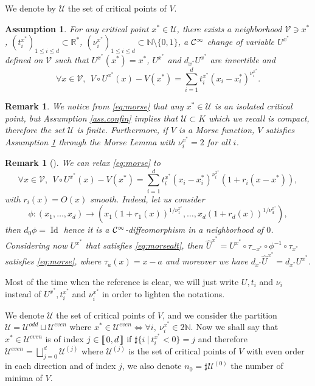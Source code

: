 \documentclass[12pt]{amsart}
\newcommand{\Id}{\operatorname{Id}}
\newcommand{\N}{\mathbb N}
\newcommand{\R}{\mathbb R}
\numberwithin{equation}{section}
\numberwithin{figure}{section}
\newcommand{\lb}{\operatorname{[\negthinspace [}}
\newcommand{\rb}{\operatorname{]\negthinspace ]}}
\newtheorem{remark}[defin]{Remark}
\newtheorem{assumption}{Assumption}
\def\uuu{{\mathcal U}}\def\vvv{{\mathcal V}}\def\www{{\mathcal W}}\def\xxx{{\mathcal X}}
\begin{document}
We denote by $\uuu$ the set of critical points of $V$.
\begin{assumption}\label{ass.morse}
    For any critical point $x^*\in\uuu$, there exists a neighborhood $\vvv\ni x^*$, $(t_i^{x^*})_{1\leq i\leq d}\subset \R^{*}$, $(\nu_i^{x^*})_{1\leq i\leq d}\subset \N\setminus\{0,1\}$, a ${\mathcal C}^\infty$ change of variable $U^{x^*}$ defined on $\vvv$ such that $U^{x^*}(x^*)=x^*$, $U^{x^*}$ and $d_{x^*}U^{x^*}$ are invertible and
    \begin{equation}\label{eq:morse}
    \forall x\in\vvv,\ \ V\circ U^{x^*}(x) - V(x^*) = \sum_{i=1}^dt_i^{x^*}(x_i-x_i^*)^{\nu_i^{x^*}}.
    \end{equation}
\end{assumption}
\begin{remark}
    We notice from \eqref{eq:morse} that any $x^*\in\uuu$ is an isolated critical point, but Assumption \ref{ass.confin} implies that $\uuu\subset K$ which we recall is compact, therefore the set $\uuu$ is finite. Furthermore, if $V$ is a Morse function, $V$ satisfies Assumption \ref{ass.morse} through the Morse Lemma with $\nu_i^{x^*} = 2$ for all $i$.
\end{remark}
\begin{remark}[\cite{De25_1}]\label{rem:relax}
    We can relax \eqref{eq:morse} to
    \begin{equation}\label{eq:morsealt}
    \forall x\in\vvv,\ \ V\circ U^{x^*}(x) - V(x^*) = \sum_{i=1}^dt_i^{x^*}(x_i-x_i^*)^{\nu_i^{x^*}}(1+r_i(x-x^*)),
    \end{equation}
    with $r_i(x) = O(x)$ smooth.
    Indeed, let us consider
    \begin{equation*}
    \phi : (x_1,\ldots,x_d)\to(x_1(1+r_1(x))^{1/\nu_1^{x^*}},\ldots,x_d(1+r_d(x))^{1/\nu_d^{x^*}}),
    \end{equation*}
    then $d_{0}\phi = \Id$ hence it is a ${\mathcal C}^\infty$-diffeomorphism in a neighborhood of $0$. Considering now $U^{x^*}$ that satisfies \eqref{eq:morsealt}, then $\hat U^{x^*} = U^{x^*}\circ\tau_{-x^*}\circ\phi^{-1}\circ\tau_{x^*}$ satisfies \eqref{eq:morse}, where $\tau_a(x) = x-a$ and moreover we have $d_{x^*}\hat U^{x^*} = d_{x^*}U^{x^*}$.
\end{remark}
Most of the time when the reference is clear, we will just write $U,t_i$ and $\nu_i$ instead of $U^{x^*},t_i^{x^*}$ and $\nu_i^{x^*}$ in order to lighten the notations.

We denote $\uuu$ the set of critical points of $V$, and we consider the partition $\uuu = \uuu^{odd}\sqcup\uuu^{even}$ where $x^*\in\uuu^{even} \iff \forall i,\ \nu_i^{x^*}\in 2\N$. Now we shall say that $x^*\in\uuu^{even}$ is of index $j\in\lb0,d\rb$ if $\sharp\{i\ |\ t_i^{x^*}<0\}=j$ and therefore $\uuu^{even}=\bigsqcup_{j=0}^d\uuu^{(j)}$ where $\uuu^{(j)}$ is the set of critical points of $V$ with even order in each direction and of index $j$, we also denote $n_0=\sharp\uuu^{(0)}$ the number of minima of $V$.
\end{document}
